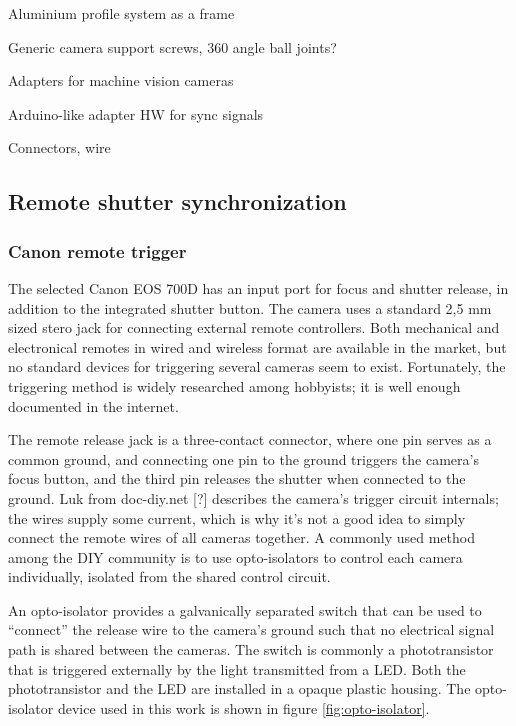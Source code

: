 Aluminium profile system as a frame

Generic camera support screws, 360 angle ball joints?

Adapters for machine vision cameras

Arduino-like adapter HW for sync signals

Connectors, wire


\subsection{Remote shutter synchronization} %


\subsubsection{Canon remote trigger} %

The selected Canon EOS 700D has an input port for focus and shutter release, in addition to the integrated shutter button.
The camera uses a standard 2,5 mm sized stero jack for connecting external remote controllers.
Both mechanical and electronical remotes in wired and wireless format are available in the market, but no standard devices for triggering several cameras seem to exist.
Fortunately, the triggering method is widely researched among hobbyists; it is well enough documented in the internet.

The remote release jack is a three-contact connector, where one pin serves as a common ground, and connecting one pin to the ground triggers the camera's focus button, and the third pin releases the shutter when connected to the ground.
Luk from doc-diy.net [?] describes the camera's trigger circuit internals; the wires supply some current, which is why it's not a good idea to simply connect the remote wires of all cameras together.
A commonly used method among the DIY community is to use opto-isolators to control each camera individually, isolated from the shared control circuit.

An opto-isolator provides a galvanically separated switch that can be used to ``connect'' the release wire to the camera's ground such that no electrical signal path is shared between the cameras.
The switch is commonly a phototransistor that is triggered externally by the light transmitted from a LED.
Both the phototransistor and the LED are installed in a opaque plastic housing.
The opto-isolator device used in this work is shown in figure \ref{fig:opto-isolator}.

